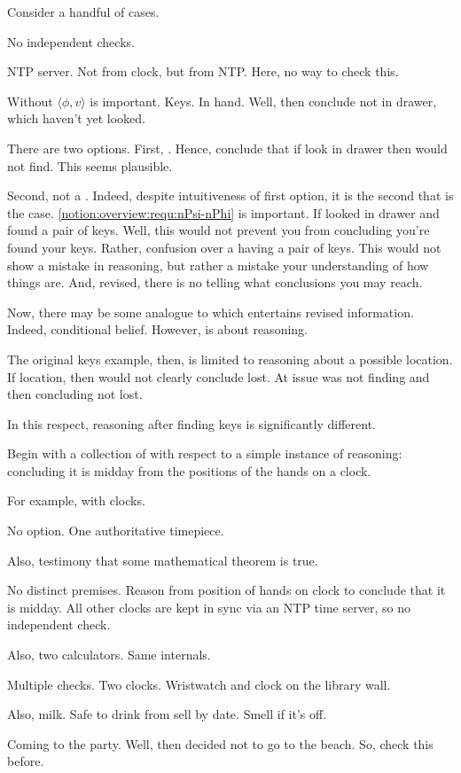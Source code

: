 \begin{note}
  Consider a handful of cases.
\end{note}

\begin{note}[Trivial]
  No independent checks.
\end{note}

\begin{note}[Pruning]
  NTP server.
  Not from clock, but from NTP.
  Here, no way to check this.
\end{note}


\begin{note}
  Without \(\langle \phi,v \rangle\) is important.
  Keys.
  In hand.
  Well, then conclude not in drawer, which haven't yet looked.

  There are two options.
  First, \requ{}.
  Hence, conclude that if look in drawer then would not find.
  This seems plausible.

  Second, not a \requ{}.
  Indeed, despite intuitiveness of first option, it is the second that is the case.
  \autoref{notion:overview:requ:nPsi-nPhi} is important.
  If looked in drawer and found a pair of keys.
  Well, this would not prevent you from concluding you're found your keys.
  Rather, confusion over a having a pair of keys.
  This would not show a mistake in reasoning, but rather a mistake your understanding of how things are.
  And, revised, there is no telling what conclusions you may reach.

  Now, there may be some analogue to \csN{} which entertains revised information.
  Indeed, conditional belief.
  However, \csN{} is about reasoning.

  The original keys example, then, is limited to reasoning about a possible location.
  If location, then would not clearly conclude lost.
  At issue was not finding and then concluding not lost.

  In this respect, reasoning after finding keys is significantly different.
\end{note}

\begin{note}[\illu{3}]
  Begin with a collection of  with respect to a simple instance of reasoning: concluding it is midday from the positions of the hands on a clock.


  For example, with clocks.

  No option.
  One authoritative timepiece.

  Also, testimony that some mathematical theorem is true.

  No distinct premises.
  Reason from position of hands on clock to conclude that it is midday.
  All other clocks are kept in sync via an NTP time server, so no independent check.

  Also, two calculators.
  Same internals.

  Multiple checks.
  Two clocks.
  Wristwatch and clock on the library wall.

  Also, milk.
  Safe to drink from sell by date.
  Smell if it's off.

  Coming to the party.
  Well, then decided not to go to the beach.
  So, check this before.
\end{note}

